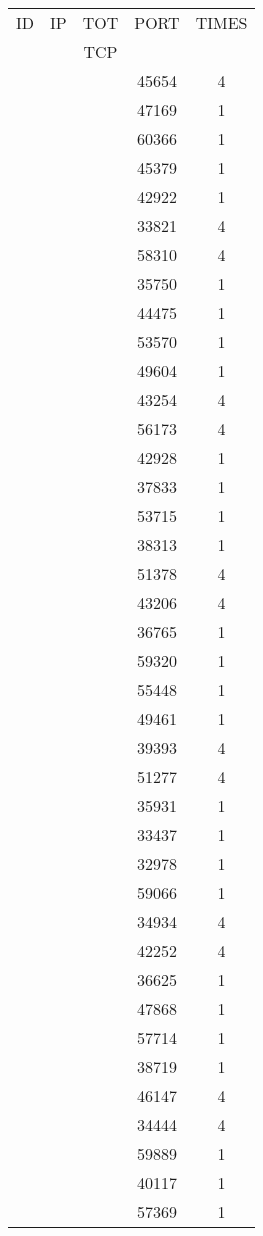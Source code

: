 \documentclass[a4paper]{scrartcl}
\begin{document}
\begin{minipage}[b]{0.5\linewidth}
\begin{tabular}{| c | c | c | c | c |}
\hline
ID & IP & TOT & PORT & TIMES \\ 
   &    & TCP &      &       \\ 
\hline
& & & 45654 & 4 \\ & & & 47169 & 1 \\ & & & 60366 & 1 \\ & & & 45379 & 1 \\ & & & 42922 & 1 \\ & & & 33821 & 4 \\ & & & 58310 & 4 \\ & & & 35750 & 1 \\ & & & 44475 & 1 \\ & & & 53570 & 1 \\ & & & 49604 & 1 \\ & & & 43254 & 4 \\ & & & 56173 & 4 \\ & & & 42928 & 1 \\ & & & 37833 & 1 \\ & & & 53715 & 1 \\ & & & 38313 & 1 \\ & & & 51378 & 4 \\ & & & 43206 & 4 \\ & & & 36765 & 1 \\ & & & 59320 & 1 \\ & & & 55448 & 1 \\ & & & 49461 & 1 \\ & & & 39393 & 4 \\ & & & 51277 & 4 \\ & & & 35931 & 1 \\ & & & 33437 & 1 \\ & & & 32978 & 1 \\ & & & 59066 & 1 \\ & & & 34934 & 4 \\ & & & 42252 & 4 \\ & & & 36625 & 1 \\ & & & 47868 & 1 \\ & & & 57714 & 1 \\ & & & 38719 & 1 \\ & & & 46147 & 4 \\ & & & 34444 & 4 \\ & & & 59889 & 1 \\ & & & 40117 & 1 \\ & & & 57369 & 1 \\ \hline\end{tabular}\end{minipage} \hfill\begin{minipage}[b]{0.5\linewidth}\begin{tabular}{| c | c | c | c | c |}

\end{tabular}
\end{minipage}
\end{document}
